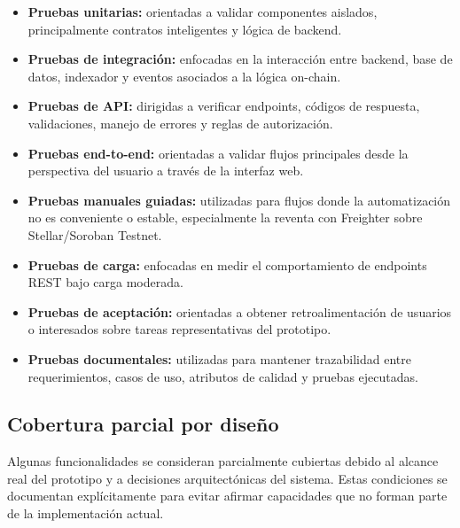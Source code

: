 \documentclass[12pt,letterpaper]{article}
\begin{document}
\begin{itemize}
    \item \textbf{Pruebas unitarias:} orientadas a validar componentes aislados, principalmente contratos inteligentes y lógica de backend.

    \item \textbf{Pruebas de integración:} enfocadas en la interacción entre backend, base de datos, indexador y eventos asociados a la lógica on-chain.

    \item \textbf{Pruebas de API:} dirigidas a verificar endpoints, códigos de respuesta, validaciones, manejo de errores y reglas de autorización.

    \item \textbf{Pruebas end-to-end:} orientadas a validar flujos principales desde la perspectiva del usuario a través de la interfaz web.

    \item \textbf{Pruebas manuales guiadas:} utilizadas para flujos donde la automatización no es conveniente o estable, especialmente la reventa con Freighter sobre Stellar/Soroban Testnet.

    \item \textbf{Pruebas de carga:} enfocadas en medir el comportamiento de endpoints REST bajo carga moderada.

    \item \textbf{Pruebas de aceptación:} orientadas a obtener retroalimentación de usuarios o interesados sobre tareas representativas del prototipo.

    \item \textbf{Pruebas documentales:} utilizadas para mantener trazabilidad entre requerimientos, casos de uso, atributos de calidad y pruebas ejecutadas.
\end{itemize}

\subsection{Cobertura parcial por diseño}

Algunas funcionalidades se consideran parcialmente cubiertas debido al alcance real del prototipo y a decisiones arquitectónicas del sistema. Estas condiciones se documentan explícitamente para evitar afirmar capacidades que no forman parte de la implementación actual.
\end{document}

